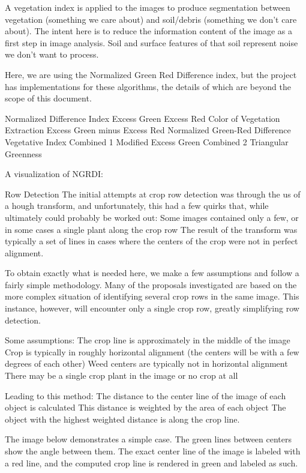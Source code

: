 \documentclass[letterpaper]{article}
\begin{document}
A vegetation index is applied to the images to produce segmentation between vegetation (something we care about) and soil/debris (something we don’t care about). The intent here is to reduce the information content of the image as a first step in image analysis. Soil and surface features of that soil represent noise we don’t want to process.

Here, we are using the Normalized Green Red Difference index, but the project has implementations for these algorithms, the details of which are beyond the scope of this document.

Normalized Difference Index
Excess Green
Excess Red
Color of Vegetation Extraction
Excess Green minus Excess Red
Normalized Green-Red Difference
Vegetative Index
Combined 1
Modified Excess Green
Combined 2
Triangular Greenness 


A visualization of NGRDI:



Row Detection
The initial attempts at crop row detection was through the us of a hough transform, and unfortunately, this had a few quirks that, while ultimately could probably be worked out:
Some images contained only a few, or in some cases a single plant along the crop row
The result of the transform was typically a set of lines in cases where the centers of the crop were not in perfect alignment.

To obtain exactly what is needed here, we make a few assumptions and follow a fairly simple methodology. Many of the proposals investigated are based on the more complex situation of identifying several crop rows in the same image. This instance, however, will encounter only a single crop row, greatly simplifying row detection.

Some assumptions:
The crop line is approximately in the middle of the image
Crop is typically in roughly horizontal alignment (the centers will be with a few degrees of each other)
Weed centers are typically not in horizontal alignment
There may be a single crop plant in the image or no crop at all

Leading to this method:
The distance to the center line of the image of each object is calculated
This distance is weighted by the area of each object
The object with the highest weighted distance is along the crop line.

The image below demonstrates a simple case. The green lines between centers show the angle between them. The exact center line of the image is labeled with a red line, and the computed crop line is rendered in green and labeled as such.
\end{document}
